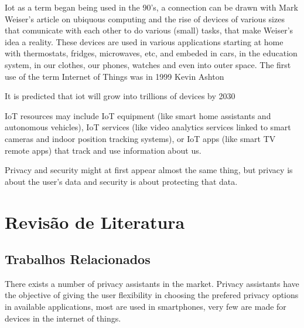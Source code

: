 \documentclass[conference]{IEEEtran}
\begin{document}
Iot as a term began being used in the 90's, a connection can be drawn
with Mark Weiser's article on ubiquous computing and the rise
of devices of various sizes that comunicate with each other to do
various (small) tasks, that make Weiser's idea a reality. These devices are
used in various applications starting at home with thermostats,
fridges, microwaves, etc, and embeded in cars, in the education system,
in our clothes, our phones, watches and even into outer space. The
first use of the term Internet of Things was in 1999  Kevin Ashton

It is predicted that iot will grow into trillions of devices by 2030 \cite{SarawiInternet}

IoT resources may include IoT equipment (like smart home assistants and
autonomous vehicles), IoT services (like video analytics services linked to
smart cameras and indoor position tracking systems), or IoT apps
(like smart TV remote apps) that track and use information about us.

Privacy and security might at first appear almost the same thing, but 
privacy is about the user's data and security is about protecting that data.

\section{Revisão de Literatura}

\subsection{Trabalhos Relacionados}


There exists a number of privacy assistants in the market. Privacy assistants
have the objective of giving the user flexibility in choosing the
prefered privacy options in available applications, most are used in
smartphones, very few are made for devices in the internet of things.
\end{document}
